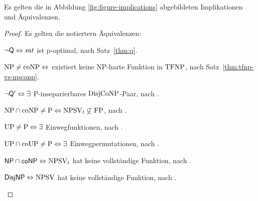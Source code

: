 \begin{theorem}\label{thm:figure-implications}
    Es gelten die in Abbildung \ref{fig:figure-implications} abgebildeten Implikationen und Äquivalenzen.
\end{theorem}
\begin{proof}
    Es gelten die notiertern Äquivalenzen:
    \begin{Prooflist}[nosep]
    \item $\neg\mathsf{Q} \Leftrightarrow \mathit{sat}$ ist p-optimal, nach Satz~\ref{thm:q}.
    \item $\mathrm{NP}\neq\mathrm{coNP} \Leftrightarrow$ existiert keine NP-harte Funktion in $\mathrm{TFNP}$, nach Satz~\ref{thm:tfnp-vs-npconp}.
    \item $\neg\mathsf{Q}' \Leftrightarrow\exists$ P-inseparierbares $\mathrm{DisjCoNP}$-Paar, nach \textcite{fortnow_separability_2002}.
    \item $\mathrm{NP}\cap\mathrm{coNP}\neq\mathrm{P} \Leftrightarrow \mathrm{NPSV}_t\not\subseteq\mathrm{FP}$, nach \textcite{selman_taxonomy_1994}.
    \item $\mathrm{UP}\neq\mathrm{P} \Leftrightarrow\exists$ Einwegfunktionen, nach \textcite[Thm.~10]{grollmann_complexity_1988}.
    \item $\mathrm{UP}\cap\mathrm{coUP}\neq\mathrm{P} \Leftrightarrow\exists$ Einwegpermutationen, nach \textcite{homan_one-way_2003}.
    \item $\mathsf{NP}{}\cap{}\mathsf{coNP} \Leftrightarrow \mathrm{NPSV}_t$ hat keine vollständige Funktion, nach \textcite[Prop.~3]{beyersdorff_nondeterministic_2009}.
    \item $\mathsf{DisjNP} \Leftrightarrow \mathrm{NPSV}$ hat keine vollständige Funktion, nach \textcite[Thm.~9]{glaser_reductions_2005}.
    \end{Prooflist}


\end{proof}
